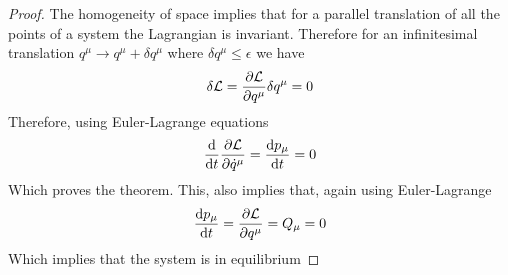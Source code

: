\documentclass[../admech.tex]{subfiles}
\begin{document}
\begin{proof}
	The homogeneity of space implies that for a parallel translation of all the points of a system the Lagrangian is invariant. Therefore for an infinitesimal translation $q^\mu\to q^\mu+\delta q^\mu$ where $\delta q^\mu\le\epsilon$ we have
	\begin{equation*}
		\delta\mathcal{L}=\pdv{\mathcal{L}}{q^\mu}\delta q^\mu=0
	\end{equation*}
	Therefore, using Euler-Lagrange equations
	\begin{equation*}
		\dv{t}\pdv{\mathcal{L}}{\dot{q}^\mu}=\dv{p_\mu}{t}=0
	\end{equation*}
	Which proves the theorem. This, also implies that, again using Euler-Lagrange
	\begin{equation*}
		\dv{p_\mu}{t}=\pdv{\mathcal{L}}{q^\mu}=Q_\mu=0
	\end{equation*}
	Which implies that the system is in equilibrium
\end{proof}
\end{document}

